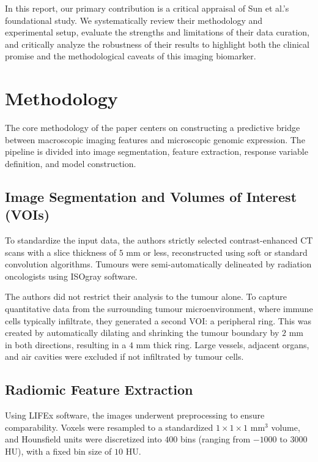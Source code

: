 \documentclass[10pt]{article}
\begin{document}
In this report, our primary contribution is a critical appraisal of Sun et al.'s \cite{main} foundational study. We systematically review their methodology and experimental setup, evaluate the strengths and limitations of their data curation, and critically analyze the robustness of their results to highlight both the clinical promise and the methodological caveats of this imaging biomarker.


\section{Methodology}
The core methodology of the paper centers on constructing a predictive bridge between macroscopic imaging features and microscopic genomic expression. The pipeline is divided into image segmentation, feature extraction, response variable definition, and model construction.

\subsection{Image Segmentation and Volumes of Interest (VOIs)}
To standardize the input data, the authors strictly selected contrast-enhanced CT scans with a slice thickness of $5$ mm or less, reconstructed using soft or standard convolution algorithms. Tumours were semi-automatically delineated by radiation oncologists using ISOgray software.

The authors did not restrict their analysis to the tumour alone. To capture quantitative data from the surrounding tumour microenvironment, where immune cells typically infiltrate, they generated a second VOI: a peripheral ring. This was created by automatically dilating and shrinking the tumour boundary by $2$ mm in both directions, resulting in a $4$ mm thick ring. Large vessels, adjacent organs, and air cavities were excluded if not infiltrated by tumour cells.

\subsection{Radiomic Feature Extraction}
Using LIFEx software, the images underwent preprocessing to ensure comparability. Voxels were resampled to a standardized $1 \times 1 \times 1$ mm$^3$ volume, and Hounsfield units were discretized into $400$ bins (ranging from $-1000$ to $3000$ HU), with a fixed bin size of $10$ HU.
\end{document}
